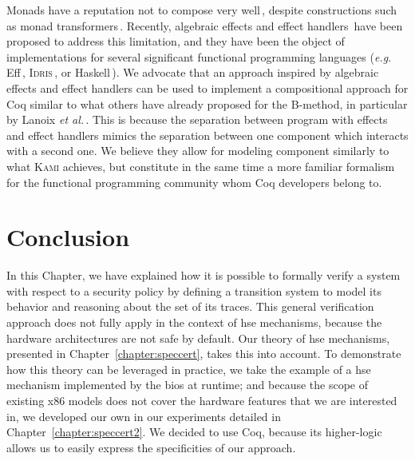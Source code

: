 Monads have a reputation not to compose very well\,\cite{hyland2006combining},
despite constructions such as monad transformers\,\cite{liang1995mtl}. 
%
Recently, algebraic effects and effect handlers\,\cite{bauer2015effects}
%
%
have been proposed to address this limitation, and they have been the object of
implementations for several significant functional programming languages
(\emph{e.g.}  Eff\,\cite{bauer2015effects}, {\scshape
  Idris}\,\cite{brady2013idris}, or Haskell\,\cite{kiselyov2013extensible}).
%
We advocate that an approach inspired by algebraic effects and effect handlers
can be used to implement a compositional approach for Coq similar to what others
have already proposed for the B-method, in particular by Lanoix \emph{et
  al.}\,\cite{lanoix:hal-00105041}.
%
This is because the separation between program with effects and effect handlers
mimics the separation between one component which interacts with a second one.
%
We believe they allow for modeling component similarly to what {\scshape Kami}
achieves, but constitute in the same time a more familiar formalism for the
functional programming community whom Coq developers belong to.

\section{Conclusion}
\label{sec:sota:conclusion}

In this Chapter, we have explained how it is possible to formally verify a
system with respect to a security policy by defining a transition system to
model its behavior and reasoning about the set of its traces.
%
This general verification approach does not fully apply in the context of
\ac{hse} mechanisms, because the hardware architectures are not safe by default.
%
Our theory of \ac{hse} mechanisms, presented in Chapter~\ref{chapter:speccert},
takes this into account.
%
To demonstrate how this theory can be leveraged in practice, we take the example
of a \ac{hse} mechanism implemented by the \ac{bios} at runtime; and because the
scope of existing x86 models does not cover the hardware features that we are
interested in, we developed our own in our experiments detailed in
Chapter~\ref{chapter:speccert2}.
%
We decided to use Coq, because its higher-logic allows us to easily express the
specificities of our approach.
%

